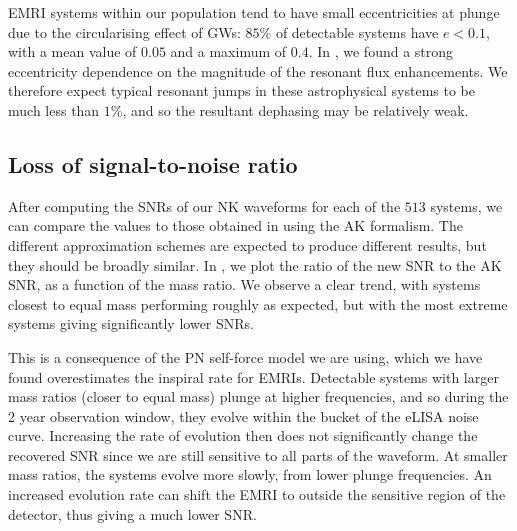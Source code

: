 EMRI systems within our population tend to have small eccentricities at plunge due to the circularising effect of GWs: $85\%$ of detectable systems have $e < 0.1$, with a mean value of $0.05$ and a maximum of $0.4$. In , we found a strong eccentricity dependence on the magnitude of the resonant flux enhancements. We therefore expect typical resonant jumps in these astrophysical systems to be much less than $1\%$, and so the resultant dephasing may be relatively weak.%

\subsection{Loss of signal-to-noise ratio}
After computing the SNRs of our NK waveforms for each of the $513$ systems, we can compare the values to those obtained in  using the AK formalism. The different approximation schemes are expected to produce different results, but they should be broadly similar. In , we plot the ratio of the new SNR to the AK SNR, as a function of the mass ratio. We observe a clear trend, with systems closest to equal mass performing roughly as expected, but with the most extreme systems giving significantly lower SNRs.

This is a consequence of the PN self-force model we are using, which we have found overestimates the inspiral rate for EMRIs. Detectable systems with larger mass ratios (closer to equal mass) plunge at higher frequencies, and so during the 2 year observation window, they evolve within the bucket of the eLISA noise curve. Increasing the rate of evolution then does not significantly change the recovered SNR since we are still sensitive to all parts of the waveform. At smaller mass ratios, the systems evolve more slowly, from lower plunge frequencies. An increased evolution rate can shift the EMRI to outside the sensitive region of the detector, thus giving a much lower SNR.

